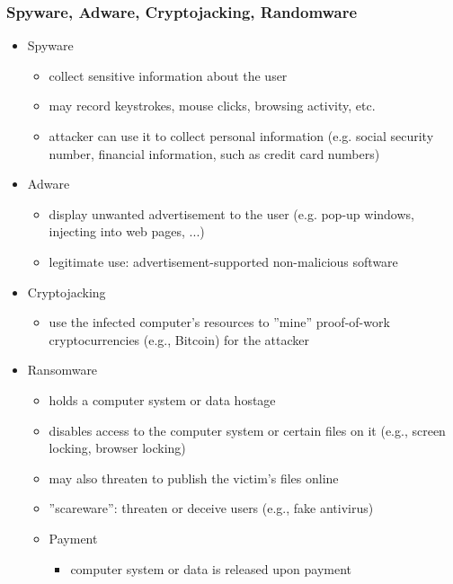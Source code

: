 \documentclass[final]{article}
\begin{document}
\subsubsection*{Spyware, Adware, Cryptojacking, Randomware}
\begin{itemize}[nosep]
    \item Spyware
          \begin{itemize}[nosep]
              \item collect sensitive information about the user
              \item may record keystrokes, mouse clicks, browsing activity, etc.
              \item attacker can use it to collect personal information (e.g. social security number, financial information, such as credit card numbers)
          \end{itemize}
    \item Adware
          \begin{itemize}[nosep]
              \item display unwanted advertisement to the user (e.g. pop-up windows, injecting into web pages, ...)
              \item legitimate use: advertisement-supported non-malicious software
          \end{itemize}
    \item Cryptojacking
          \begin{itemize}[nosep]
              \item use the infected computer's resources to ''mine'' proof-of-work cryptocurrencies (e.g., Bitcoin) for the attacker
          \end{itemize}
    \item Ransomware
          \begin{itemize}
              \item holds a computer system or data hostage
              \item disables access to the computer system or certain files on it (e.g., screen locking, browser locking)
              \item may also threaten to publish the victim's files online
              \item ''scareware'': threaten or deceive users (e.g., fake antivirus)
              \item Payment
                    \begin{itemize}[nosep]
                        \item computer system or data is released upon payment

\end{itemize}
\end{itemize}
\end{itemize}
\end{document}
